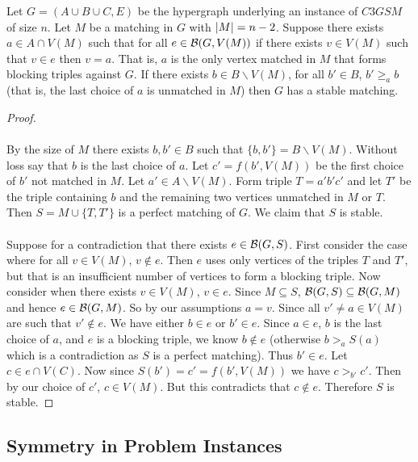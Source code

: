 \begin{lemma}\label{lemma:fixing}
Let $G = (A\cup B \cup C, E)$ be the hypergraph underlying an instance of $C3GSM$ of size $n$. Let $M$ be a matching in $G$ with $\left|M\right| = n-2$. Suppose there exists $a \in A \cap V(M)$ such that for all $e \in \mathcal{B}(G, V(M))$ if there exists $v \in V(M)$ such that $v \in e$ then $v = a$. That is, $a$ is the only vertex matched in $M$ that forms blocking triples against $G$. If there exists $b \in B\backslash V(M)$, for all $b' \in B$, $b' \geq_a b$ (that is, the last choice of $a$ is unmatched in $M$) then $G$ has a stable matching.
\end{lemma}
\begin{proof}
\paragraph{}
By the size of $M$ there exists $b,b' \in B$ such that $\{b,b'\} = B \backslash V(M)$. Without loss say that $b$ is the last choice of $a$. Let $c' = f(b', V(M))$ be the first choice of $b'$ not matched in $M$. Let $a' \in A\backslash V(M)$. Form triple $T = a'b'c'$ and let $T'$ be the triple containing $b$ and the remaining two vertices unmatched in $M$ or $T$. Then $S = M \cup \{T, T'\}$ is a perfect matching of $G$. We claim that $S$ is stable.
\paragraph{}
Suppose for a contradiction that there exists $e \in \mathcal{B}(G,S)$. First consider the case where for all $v \in V(M)$, $v \not\in e$. Then $e$ uses only vertices of the triples $T$ and $T'$, but that is an insufficient number of vertices to form a blocking triple. Now consider when there exists $v \in V(M)$, $v \in e$. Since $M \subseteq S$, $\mathcal{B}(G,S) \subseteq \mathcal{B}(G,M)$ and hence $e \in \mathcal{B}(G,M)$. So by our assumptions $a=v$. Since all $v' \neq a \in V(M)$ are such that $v' \not\in e$. We have either $b \in e$ or $b' \in e$. Since $a \in e$, $b$ is the last choice of $a$, and $e$ is a blocking triple, we know $b \not\in e$ (otherwise $b >_a S(a)$ which is a contradiction as $S$ is a perfect matching). Thus $b' \in e$. Let $c \in e \cap V(C)$. Now since $S(b') = c' = f(b',V(M))$ we have $c >_{b'} c'$. Then by our choice of $c'$, $c \in V(M)$. But this contradicts that $c \not\in e$. Therefore $S$ is stable.
\end{proof}
\subsection{Symmetry in Problem Instances}
